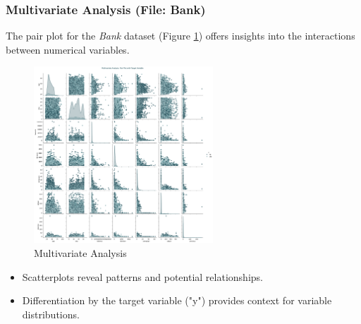 \documentclass{article}
\begin{document}
 \subsubsection{Multivariate Analysis  (File: Bank)}
 The pair plot for the \textit{Bank} dataset (Figure \ref{fig:pair_plot_bank}) offers insights into the interactions between numerical variables.
 \begin{figure}[h]
                \centering
                \includegraphics[width=0.6\textwidth]{data/bank_marketing/pic/Bank_pairplot.png}
                \caption{Multivariate Analysis}
                \label{fig:pair_plot_bank}
            \end{figure}
\begin{itemize}
    \item Scatterplots reveal patterns and potential relationships.
    \item Differentiation by the target variable ("y") provides context for variable distributions.
    \vspace{300pt}
\end{itemize}
\end{document}
